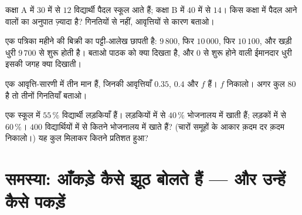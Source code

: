 \begin{exercise}[$\star\star$]\label{exo:g7:stats:8}
कक्षा A में $30$ में से $12$ विद्यार्थी पैदल स्कूल आते हैं; कक्षा
B में $40$ में से $14$। किस कक्षा में पैदल आने वालों का अनुपात
ज़्यादा है? गिनतियों से नहीं, आवृत्तियों से कारण बताओ।
\end{exercise}

\begin{exercise}[$\star\star$]\label{exo:g7:stats:9}
एक पत्रिका महीने की बिक्री का पट्टी-आलेख छापती है: $9\,800$, फिर
$10\,000$, फिर $10\,100$, और खड़ी धुरी $9\,700$ से शुरू होती है।
बताओ पाठक को क्या दिखता है, और $0$ से शुरू होने वाली ईमानदार धुरी
इसकी जगह क्या दिखाती।
\end{exercise}

\begin{exercise}[$\star\star$]\label{exo:g7:stats:10}
एक आवृत्ति-सारणी में तीन मान हैं, जिनकी आवृत्तियाँ $0.35$, $0.4$
और $f$ हैं। $f$ निकालो। अगर कुल  $80$ है तो तीनों गिनतियाँ
बताओ।
\end{exercise}

\begin{exercise}[$\star\star\star$]\label{exo:g7:stats:11}
एक स्कूल में $55\,\%$ विद्यार्थी लड़कियाँ हैं। लड़कियों में से
$40\,\%$ भोजनालय में खाती हैं; लड़कों में से $60\,\%$। $400$
विद्यार्थियों में से कितने भोजनालय में खाते हैं? (चारों समूहों के
आकार क़दम दर क़दम निकालो।) यह कुल मिलाकर कितने प्रतिशत हुआ?
\end{exercise}

\section{समस्या: आँकड़े कैसे झूठ बोलते हैं --- और उन्हें कैसे पकड़ें}

